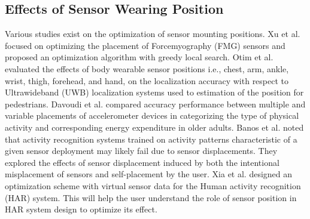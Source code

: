 \documentclass[sigconf]{acmart}
\begin{document}
\subsection{Effects of Sensor Wearing Position}
Various studies exist on the optimization of sensor mounting positions.
Xu et al.\cite{sensor_placement_xu} focused on optimizing the placement of Forcemyography (FMG) sensors and proposed an optimization algorithm with greedy local search.
Otim et al.\cite{sensor_placement_otim} evaluated the effects of body wearable sensor positions i.e., chest, arm, ankle, wrist, thigh, forehead, and hand, on the localization accuracy with respect to Ultrawideband (UWB) localization systems used to estimation of the position for pedestrians.
Davoudi et al.\cite{sensor_placement_davoudi} compared accuracy performance between multiple and variable placements of accelerometer devices in categorizing the type of physical activity and corresponding energy expenditure in older adults.
Banos et al.\cite{sensor_placement_banos} noted that activity recognition systems trained on activity patterns characteristic of a given sensor deployment may likely fail due to sensor displacements. They explored the effects of sensor displacement induced by both the intentional misplacement of sensors and self-placement by the user.
Xia et al.\cite{sensor_placement_xia} designed an optimization scheme with virtual sensor data for the Human activity recognition (HAR) system. This will help the user understand the role of sensor position in HAR system design to optimize its effect.\par
\end{document}
